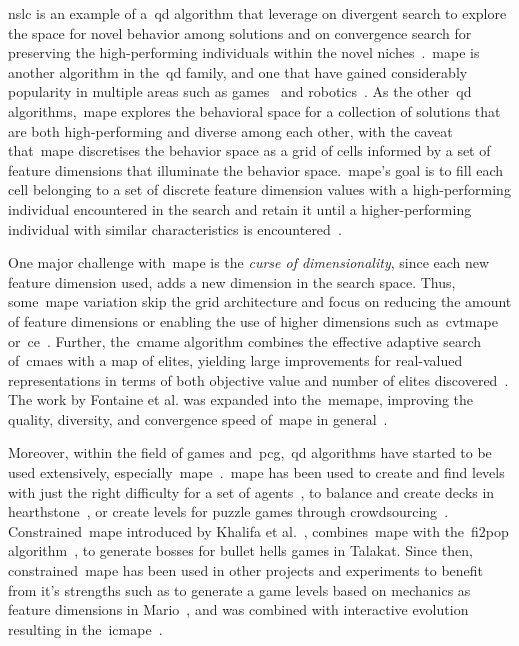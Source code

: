 \acrshort{nslc} is an example of a~\acrshort{qd} algorithm that leverage on divergent search to explore the space for novel behavior among solutions and on convergence search for preserving the high-performing individuals within the novel niches~\cite{Lehman2011-NSLC}.~\acrfull{mape} is another algorithm in the~\acrshort{qd} family, and one that have gained considerably popularity in multiple areas such as games~\cite{charity2020mech,Fontaine2019-hearhstoneDecks} and robotics~\cite{Cully2015-qdRobotsAnimals}. As the other~\acrshort{qd} algorithms,~\acrshort{mape} explores the behavioral space for a collection of solutions that are both high-performing and diverse among each other, with the caveat that~\acrshort{mape} discretises the behavior space as a grid of cells informed by a set of feature dimensions that illuminate the behavior space.~\acrshort{mape}'s goal is to fill each cell belonging to a set of discrete feature dimension values with a high-performing individual encountered in the search and retain it until a higher-performing individual with similar characteristics is encountered~\cite{Mouret2015}.

One major challenge with~\acrshort{mape} is the \emph{curse of dimensionality}, since each new feature dimension used, adds a new dimension in the search space. Thus, some~\acrshort{mape} variation skip the grid architecture and focus on reducing the amount of feature dimensions or enabling the use of higher dimensions such as~\acrlong{cvtmape}~\cite{cvt-mape2016} or~\acrlong{ce}~\cite{cluster-mape2017}. Further, the~\acrlong{cmame} algorithm combines the effective adaptive search of~\acrlong{cmaes} with a map of elites, yielding large improvements for real-valued representations in terms of both objective value and number of elites discovered~\cite{fontaine2019covariance}. The work by Fontaine et al. was expanded into the~\acrlong{memape}, improving the quality, diversity, and convergence speed of~\acrshort{mape} in general~\cite{cully2020-multiemitter}.

Moreover, within the field of games and~\acrshort{pcg},~\acrshort{qd} algorithms have started to be used extensively, especially~\acrshort{mape}~\cite{gravina2019procedural}.~\acrshort{mape} has been used to create and find levels with just the right difficulty for a set of agents~\cite{Gonzalez-Duque2020-DifficultyTrialError}, to balance and create decks in hearthstone~\cite{Fontaine2019-hearhstoneDecks}, or create levels for puzzle games through crowdsourcing~\cite{charity2020baba}. Constrained~\acrshort{mape} introduced by Khalifa et al.~\cite{Khalifa2018}, combines~\acrshort{mape} with the~\acrfull{fi2pop} algorithm~\cite{Kimbrough2008}, to generate bosses for bullet hells games in Talakat. Since then, constrained~\acrshort{mape} has been used in other projects and experiments to benefit from it's strengths such as to generate a game levels based on mechanics as feature dimensions in Mario~\cite{Khalifa2019-intentionalCompLevel,charity2020mech}, and was combined with interactive evolution resulting in the~\acrlong{icmape}~\cite{alvarez2019empowering}. 

